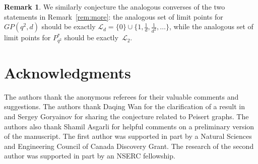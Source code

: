 \documentclass[12pt,reqno]{amsart}
\theoremstyle{definition}
\newtheorem{rem}[thm]{Remark}
\begin{document}
\begin{rem}
We similarly conjecture the analogous converses of the two statements in Remark~\ref{rem:more}: the analogous set of limit points for $GP(q^2,d)$ should be exactly $\mathcal{L}_d = \{0\} \cup \{ 1, \frac1d, \frac1{d^2}, \dots\}$, while the analogous set of limit points for $P^*_{q^2}$ should be exactly~$\mathcal{L}_2$.
\end{rem}

\section*{Acknowledgments}

The authors thank the anonymous referees for their valuable comments and suggestions.
The authors thank Daqing Wan for the clarification of a result in~\cite{W97} and Sergey Goryainov for sharing the conjecture related to Peisert graphs. The authors also thank Shamil Asgarli for helpful comments on a preliminary version of the manuscript. The first author was supported in part by a Natural Sciences and Engineering Council of Canada Discovery Grant. The research of the second author was supported in part by an NSERC fellowship.



\end{document}
